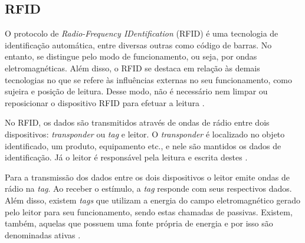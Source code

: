 \subsection{RFID}


O protocolo de \textit{Radio-Frequency IDentification} (RFID) é uma tecnologia de identificação automática, entre diversas outras como código de barras. No entanto, se distingue pelo modo de funcionamento, ou seja, por ondas eletromagnéticas. Além disso, o RFID se destaca em relação às demais tecnologias no que se refere às influências externas no seu funcionamento, como sujeira e posição de leitura. Desse modo, não é necessário nem limpar ou reposicionar o dispositivo RFID para efetuar a leitura \cite{Finkenzeller2010}. 


No RFID, os dados são transmitidos através de ondas de rádio entre dois dispositivos: \textit{transponder} ou \textit{tag} e leitor. O \textit{transponder} é localizado no objeto identificado, um produto, equipamento etc., e nele são mantidos os dados de identificação. Já o leitor é responsável pela leitura e escrita destes \cite{Finkenzeller2010}.

Para a transmissão dos dados entre os dois dispositivos o leitor emite ondas de rádio na \textit{tag}. Ao receber o estímulo, a \textit{tag} responde com seus respectivos dados. Além disso, existem \textit{tags} que utilizam a energia do campo eletromagnético gerado pelo leitor para seu funcionamento, sendo estas chamadas de passivas. Existem, também, aquelas que possuem uma fonte própria de energia e por isso são denominadas ativas \cite{Finkenzeller2010}.





